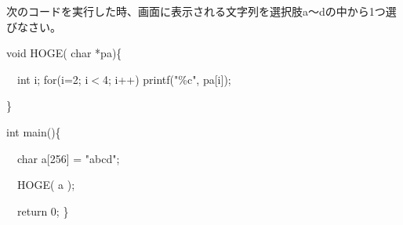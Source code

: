 次のコードを実行した時、画面に表示される文字列を選択肢a〜dの中から1つ選びなさい。\par
\noindent void HOGE( char *pa)\{ \par
\noindent 　int i; for(i=2; i$<$4; i++) printf("\%c", pa[i]); \par
\noindent \} \par
\noindent int main()\{ \par
\noindent 　char a[256] = "abcd"; \par
\noindent 　HOGE( a ); \par
\noindent 　return 0; \} \par
